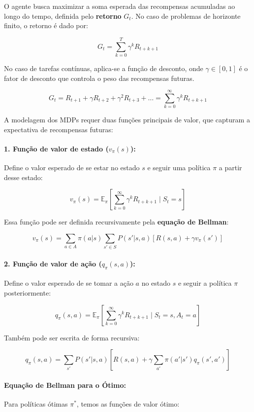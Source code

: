 O agente busca maximizar a soma esperada das recompensas acumuladas ao longo do tempo, definida pelo \textbf{retorno} \(G_t\). No caso de problemas de horizonte finito, o retorno é dado por:

\[
G_t = \sum_{k=0}^{T} \gamma^k R_{t+k+1}
\]

No caso de tarefas contínuas, aplica-se a função de desconto, onde \(\gamma \in [0, 1]\) é o fator de desconto que controla o peso das recompensas futuras.

\[
G_t = R_{t+1} + \gamma R_{t+2} + \gamma^2 R_{t+3} + \dots = \sum_{k=0}^{\infty} \gamma^k R_{t+k+1}
\]

A modelagem dos MDPs requer duas funções principais de valor, que capturam a expectativa de recompensas futuras:

\paragraph{1. Função de valor de estado (\(v_\pi(s)\)):}
Define o valor esperado de se estar no estado \(s\) e seguir uma política \(\pi\) a partir desse estado:

\[
v_\pi(s) = \mathbb{E}_\pi \left[ \sum_{k=0}^{\infty} \gamma^k R_{t+k+1} \mid S_t = s \right]
\]

Essa função pode ser definida recursivamente pela \textbf{equação de Bellman}:

\[
v_\pi(s) = \sum_{a \in A} \pi(a|s) \sum_{s' \in S} P(s'|s, a) \left[ R(s, a) + \gamma v_\pi(s') \right]
\]

\paragraph{2. Função de valor de ação (\(q_\pi(s, a)\)):}
Define o valor esperado de se tomar a ação \(a\) no estado \(s\) e seguir a política \(\pi\) posteriormente:

\[
q_\pi(s, a) = \mathbb{E}_\pi \left[ \sum_{k=0}^{\infty} \gamma^k R_{t+k+1} \mid S_t = s, A_t = a \right]
\]

Também pode ser escrita de forma recursiva:

\[
q_\pi(s, a) = \sum_{s'} P(s'|s, a) \left[ R(s, a) + \gamma \sum_{a'} \pi(a'|s') q_\pi(s', a') \right]
\]

\paragraph{Equação de Bellman para o Ótimo:}
Para políticas ótimas \(\pi^*\), temos as funções de valor ótimo:

